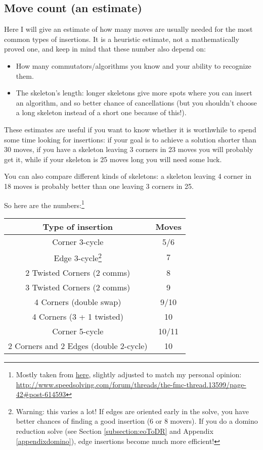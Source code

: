 \documentclass[11pt,a4paper]{book}
\begin{document}
\subsection{Move count (an estimate)}

Here I will give an estimate of how many moves are usually needed for the most common types of insertions. It is a heuristic estimate, not a mathematically proved one, and keep in mind that these number also depend on:
\begin{itemize}
\item How many commutators/algorithms you know and your ability to recognize them.
\item The skeleton's length: longer skeletons give more spots where you can insert an algorithm, and so better chance of cancellations (but you shouldn't choose a long skeleton instead of a short one because of this!).
\end{itemize}
These estimates are useful if you want to know whether it is worthwhile to spend some time looking for insertions: if your goal is to achieve a solution shorter than 30 moves, if you have a skeleton leaving 3 corners in 23 moves you will probably get it, while if your skeleton is 25 moves long you will need some luck.

You can also compare different kinds of skeletons: a skeleton leaving 4 corner in 18 moves is probably better than one leaving 3 corners in 25.

So here are the numbers:\footnote{Mostly taken from \href{https://www.speedsolving.com/forum/threads/the-fmc-thread.13599/page-42\#post-614593}{here}, slightly adjusted to match my personal opinion: \url{http://www.speedsolving.com/forum/threads/the-fmc-thread.13599/page-42\#post-614593}}

\begin{center}
\begin{tabular}{|c|c|}
\hline
\textbf{Type of insertion} & \textbf{Moves}\\
\hline
Corner 3-cycle & 5/6\\
\hline
Edge 3-cycle\footnote{Warning: this varies a lot! If edges are oriented early in the solve, you have better chances of finding a good insertion (6 or 8 movers). If you do a domino reduction solve (see Section \ref{subsection:eoToDR} and Appendix \ref{appendixdomino}), edge insertions become much more efficient!} & 7\\
\hline
2 Twisted Corners (2 comms) & 8\\
\hline
3 Twisted Corners (2 comms) & 9\\
\hline
4 Corners (double swap) & 9/10\\
\hline
4 Corners (3 + 1 twisted) & 10\\
\hline
Corner 5-cycle & 10/11\\
\hline
2 Corners and 2 Edges (double 2-cycle) & 10\\
\hline
\end{tabular}
\end{center}
\end{document}
